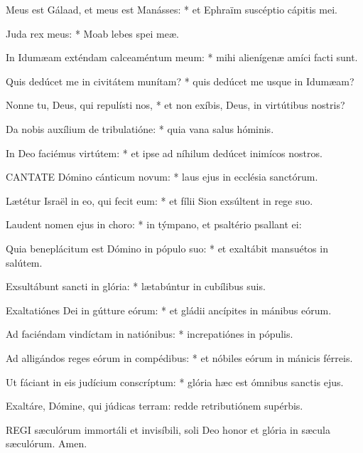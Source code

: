 Meus est Gálaad, et meus est Manásses: * et Ephraïm suscéptio cápitis mei.

Juda rex meus: * Moab lebes spei meæ.

In Idumæam exténdam calceaméntum meum: * mihi alienígenæ amíci facti sunt.

Quis dedúcet me in civitátem munítam? * quis dedúcet me usque in Idumæam?

Nonne tu, Deus, qui repulísti nos, * et non exíbis, Deus, in virtútibus nostris?

Da nobis auxílium de tribulatióne: * quia vana salus hóminis.

In Deo faciémus virtútem: * et ipse ad níhilum dedúcet inimícos nostros.



\lettrine[lines=2]{C}{ANTATE} Dómino cánticum novum: * laus ejus in ecclésia sanctórum.

Lætétur Israël in eo, qui fecit eum: * et fílii Sion exsúltent in rege suo.

Laudent nomen ejus in choro: * in týmpano, et psaltério psallant ei:

Quia beneplácitum est Dómino in pópulo suo: * et exaltábit mansuétos in salútem.

Exsultábunt sancti in glória: * lætabúntur in cubílibus suis.

Exaltatiónes Dei in gútture eórum: * et gládii ancípites in mánibus eórum.

Ad faciéndam vindíctam in natiónibus: * increpatiónes in pópulis.

Ad alligándos reges eórum in compédibus: * et nóbiles eórum in mánicis férreis.

Ut fáciant in eis judícium conscríptum: * glória hæc est ómnibus sanctis ejus.


 Exaltáre, Dómine, qui júdicas terram: redde retributiónem supérbis.



\lettrine[lines=2]{R}{EGI} sæculórum immortáli et invisíbili, soli Deo honor et glória in sæcula sæculórum. Amen.

